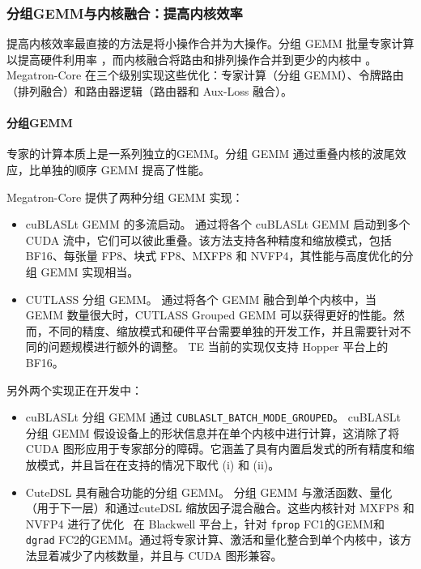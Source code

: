 \subsubsection{分组GEMM与内核融合：提高内核效率}\label{sec:kernel-fusion}

提高内核效率最直接的方法是将小操作合并为大操作。分组 GEMM 批量专家计算以提高硬件利用率 \cite{megablocks}，而内核融合将路由和排列操作合并到更少的内核中 \cite{chen2018tvm}。 Megatron-Core 在三个级别实现这些优化：专家计算（分组 GEMM）、令牌路由（排列融合）和路由器逻辑（路由器和 Aux-Loss 融合）。

\paragraph{分组GEMM}\label{sec:grouped-gemm}

专家的计算本质上是一系列独立的GEMM。分组 GEMM 通过重叠内核的波尾效应，比单独的顺序 GEMM 提高了性能。

Megatron-Core 提供了两种分组 GEMM 实现：

\begin{itemize}
\item[i.] cuBLASLt GEMM 的多流启动。
通过将各个 cuBLASLt GEMM 启动到多个 CUDA 流中，它们可以彼此重叠。该方法支持各种精度和缩放模式，包括 BF16、每张量 FP8、块式 FP8、MXFP8 和 NVFP4，其性能与高度优化的分组 GEMM 实现相当。

\item[ii.]\label{gmm:2} CUTLASS 分组 GEMM。
通过将各个 GEMM 融合到单个内核中，当 GEMM 数量很大时，CUTLASS Grouped GEMM 可以获得更好的性能。然而，不同的精度、缩放模式和硬件平台需要单独的开发工作，并且需要针对不同的问题规模进行额外的调整。 TE 当前的实现仅支持 Hopper 平台上的 BF16。
\end{itemize}


另外两个实现正在开发中：

\begin{itemize}
\item[iii.] cuBLASLt 分组 GEMM 通过 \texttt{CUBLASLT\_BATCH\_MODE\_GROUPED}。
cuBLASLt 分组 GEMM 假设设备上的形状信息并在单个内核中进行计算，这消除了将 CUDA 图形应用于专家部分的障碍。它涵盖了具有内置启发式的所有精度和缩放模式，并且旨在在支持的情况下取代 (i) 和 (ii)。

\item[iv.] CuteDSL 具有融合功能的分组 GEMM。
分组 GEMM 与激活函数、量化（用于下一层）和通过cuteDSL 缩放因子混合融合。这些内核针对 MXFP8 和 NVFP4 进行了优化~\cite{abecassis2025nvfp4} 在 Blackwell 平台上，针对 \texttt{fprop} FC1的GEMM和 \texttt{dgrad} FC2的GEMM。通过将专家计算、激活和量化整合到单个内核中，该方法显着减少了内核数量，并且与 CUDA 图形兼容。
\end{itemize}

